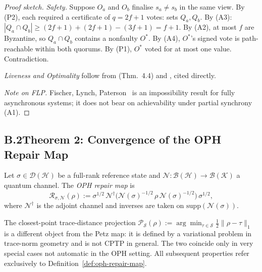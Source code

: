 \begin{proof}[Proof sketch]
\textit{Safety.}
Suppose $O_a$ and $O_b$ finalise $s_a\neq s_b$ in the same view.
By (P2), each required a certificate of $q=2f+1$ votes: sets $Q_a,Q_b$.
By (A3): $|Q_a\cap Q_b|\geq(2f+1)+(2f+1)-(3f+1)=f+1$.
By (A2), at most $f$ are Byzantine, so $Q_a\cap Q_b$ contains a
nonfaulty $O^*$.
By (A4), $O^*$'s signed vote is path-reachable within both quorums.
By (P1), $O^*$ voted for at most one value. Contradiction.

\textit{Liveness and Optimality}
follow from \cite{DLS88} (Thm.~4.4) and \cite{Lamport1982}, cited directly.

\textit{Note on FLP.}
Fischer, Lynch, Paterson~\cite{FLP85} is an impossibility result for
fully asynchronous systems; it does not bear on achievability under
partial synchrony (A1).
\end{proof}

\subsection*{B.2\quad Theorem 2: Convergence of the OPH Repair Map}

\begin{definition}
\label{def:oph-repair-map}
Let $\sigma\in\mathcal{D}(\mathcal{H})$ be a full-rank reference state and
$\mathcal{N}:\mathcal{B}(\mathcal{H})\to\mathcal{B}(\mathcal{K})$ a quantum channel.
The \emph{OPH repair map} is
\[
  \mathcal{R}_{\sigma,\mathcal{N}}(\rho)
  := \sigma^{1/2}\,
     \mathcal{N}^\dagger\!\bigl(
       \mathcal{N}(\sigma)^{-1/2}\,\rho\,\mathcal{N}(\sigma)^{-1/2}
     \bigr)
     \,\sigma^{1/2},
\]
where $\mathcal{N}^\dagger$ is the adjoint channel and inverses are
taken on $\mathrm{supp}(\mathcal{N}(\sigma))$.
\end{definition}

\begin{remark}
The closest-point trace-distance projection
$\mathcal{P}_{\mathcal{S}}(\rho):=\arg\min_{\tau\in\mathcal{S}}\tfrac12\|\rho-\tau\|_1$
is a different object from the Petz map: it is defined by a variational
problem in trace-norm geometry and is not \textrm{CPTP} in general.
The two coincide only in very special cases not automatic in the
\textrm{OPH} setting.
All subsequent properties refer exclusively to
Definition~\ref{def:oph-repair-map}.
\end{remark}

